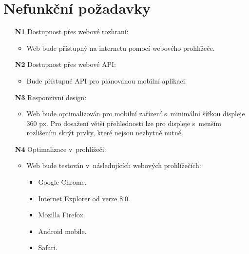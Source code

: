 \section{Nefunkční požadavky}

\begin{itemize}
    \item[\textbf{N1}] Dostupnost přes webové rozhraní:
        \begin{itemize}
            \item Web bude přístupný na internetu pomocí webového prohlížeče.
        \end{itemize}
    \item[\textbf{N2}] Dostupnost přes webové API:
        \begin{itemize}
            \item Bude přístupné API pro plánovanou mobilní aplikaci.
        \end{itemize}
    \item[\textbf{N3}] Responzivní design:
        \begin{itemize}
            \item Web bude optimalizován pro mobilní zařízení s~minimální šířkou displeje 360 px. Pro dosažení větší přehlednosti lze pro displeje s~menším rozlišením skrýt prvky, které nejsou nezbytně nutné.
        \end{itemize}
    \item[\textbf{N4}] Optimalizace v~prohlížeči:
        \begin{itemize}
            \item Web bude testován v~následujících webových prohlížečích:
                \begin{itemize}
                    \item Google Chrome.
                    \item Internet Explorer od verze 8.0.
                    \item Mozilla Firefox.
                    \item Android mobile.
                    \item Safari.
                \end{itemize}
        \end{itemize}
\end{itemize}
